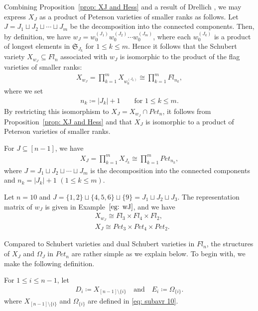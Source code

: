 Combining Proposition~\ref{prop: XJ and Hess} and a result of Drellich \cite[Theorem 4.5]{Dre1}, we may express $X_J$ as a product of Peterson varieties of smaller ranks as follows. 
Let $J = J_1 \sqcup J_2 \sqcup \cdots \sqcup J_{m}$ be the decomposition into the connected components. Then, by definition, we have $w_J=w_0^{(J_1)} w_0^{(J_2)} \cdots w_0^{(J_{m})}$, where each $w_0^{(J_k)}$ is a product of longest elements in $\mathfrak{S}_{J_k}$ for $1\le k\le m$. Hence it follows that the Schubert variety $X_{w_J}\subseteq Fl_n$ associated with $w_J$ is isomorphic to the product of the flag varieties of smaller ranks:
\begin{align*}
 X_{w_J} = \prod_{k=1}^{m} X_{w_0^{(J_k)}} \cong \prod_{k=1}^{m} Fl_{n_k}, 
\end{align*}
where we set
\begin{align*}
 n_k\coloneqq |J_k|+1 \qquad \text{for $1\le k\le m$}.
\end{align*}
By restricting this isomorphism to $X_J = X_{w_J}\cap Pet_{n}$, it follows from Proposition~\ref{prop: XJ and Hess} and \cite[Theorem 4.5]{Dre1} that $X_{J}$ is isomorphic to a product of Peterson varieties of smaller ranks. 
\begin{coro}\label{lem: decomp of PetJ}
For $J\subseteq[n-1]$, we have
\begin{align*}
 X_{J} = \prod_{k=1}^{m} X_{J_k} \cong
 \prod_{k=1}^{m} Pet_{n_k},
\end{align*}
where $J = J_1 \sqcup J_2 \sqcup \cdots \sqcup J_{m}$ is the decomposition into the connected components and $n_k= |J_k|+1$ $(1\le k\le m)$.
\end{coro}

\begin{exam}\label{ex: product decomp}
{\rm 
Let $n=10$ and $J =\{1,2\} \sqcup\{4,5,6\} \sqcup\{9\} = J_1\sqcup J_2\sqcup J_3$. The representation matrix of $w_J$ is given in Example~$\ref{eg: wJ}$, and we have 
\begin{align*}
&X_{w_J} \cong Fl_3\times Fl_4\times Fl_2, \\
&X_{J} \cong Pet_{3}\times Pet_{4}\times Pet_{2}.
\end{align*}
}
\end{exam}

Compared to Schubert varieties and dual Schubert varieties in $Fl_n$, the structures of $X_J$ and $\Omega_J$ in $Pet_{n}$ are rather simple as we explain below.
To begin with, we make the following definition.
\begin{defi}
For $1\le i\le n-1$, let
\begin{equation}
\begin{split}\label{eq: div 10}
D_{i} \coloneqq X_{[n-1]\setminus\{i\}}
\quad \text{and} \quad
E_{i} \coloneqq \Omega_{\{i\}}.
\end{split}
\end{equation}
where $X_{[n-1]\setminus\{i\}}$ and $\Omega_{\{i\}}$ are defined in \eqref{eq: subavr 10}.
\end{defi}

